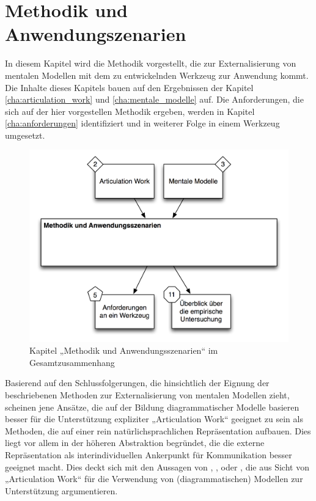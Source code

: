 
\chapter{Methodik und Anwendungszenarien} %
\label{cha:methodik}

In diesem Kapitel wird die Methodik vorgestellt, die zur Externalisierung von mentalen Modellen mit dem zu entwickelnden Werkzeug zur Anwendung kommt. Die Inhalte dieses Kapitels bauen auf den Ergebnissen der Kapitel \ref{cha:articulation_work}  und \ref{cha:mentale_modelle} auf. Die Anforderungen, die sich auf der hier vorgestellen Methodik ergeben, werden in Kapitel \ref{cha:anforderungen} identifiziert und in weiterer Folge in einem Werkzeug umgesetzt.

\begin{figure}[htbp]
	\centering
		\includegraphics[scale=0.75]{img/Kontextgrafiken/k4.png}
	\caption{Kapitel „Methodik und Anwendungsszenarien“ im Gesamtzusammenhang}
	\label{fig:img_Kontextgrafiken_k4}
\end{figure}

Basierend auf den Schlussfolgerungen, die \citet{Ifenthaler06} hinsichtlich der Eignung der beschriebenen Methoden zur Externalisierung von mentalen Modellen zieht, scheinen jene Ansätze, die auf der Bildung diagrammatischer Modelle basieren besser für die Unterstützung expliziter „Articulation Work“ geeignet zu sein als Methoden, die auf einer rein natürlichsprachlichen Repräsentation aufbauen. Dies liegt vor allem in der höheren Abstraktion begründet, die die externe Repräsentation als interindividuellen Ankerpunkt für Kommunikation besser geeignet macht. Dies deckt sich mit den Aussagen von  \citet{Sarini02}, \citet{Herrmann02}, \citet{Raposo04} oder \citet{Jorgensen04}, die aus Sicht von „Articulation Work“ für die Verwendung von (diagrammatischen) Modellen zur Unterstützung argumentieren.

